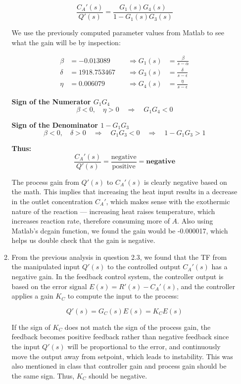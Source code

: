 \documentclass[12pt]{article}
\begin{document}
\begin{enumerate}
\begin{enumerate}
    \[
    \frac{C_A'(s)}{Q'(s)} = \frac{G_1(s) G_4(s)}{1 - G_1(s) G_3(s)}
    \]
    
    We use the previously computed parameter values from Matlab to see what the gain will be by inspection:
    
    \[
    \begin{aligned}
    \beta &= -0.013089 \quad &\Rightarrow G_1(s) &= \frac{\beta}{s - \alpha} \\
    \delta &= 1918.753467 \quad &\Rightarrow G_3(s) &= \frac{\delta}{s - \epsilon} \\
    \eta &= 0.006079 \quad &\Rightarrow G_4(s) &= \frac{\eta}{s - \epsilon}
    \end{aligned}
    \]
    
    \medskip
    
    \noindent\textbf{Sign of the Numerator \(G_1 G_4\)}  
    \[
    \beta < 0, \quad \eta > 0 \quad \Rightarrow \quad G_1 G_4 < 0
    \]
    
    \noindent\textbf{Sign of the Denominator \(1 - G_1 G_3\)}  
    \[
    \beta < 0, \quad \delta > 0 \quad \Rightarrow \quad G_1 G_3 < 0 \quad \Rightarrow \quad 1 - G_1 G_3 > 1
    \]
    
    \noindent\textbf{Thus:}
    \[
    \frac{C_A'(s)}{Q'(s)} = \frac{\text{negative}}{\text{positive}} = \textbf{negative}
    \]
    
    \medskip
    
    \noindent The process gain from \(Q'(s)\) to \(C_A'(s)\) is clearly negative based on the math. This implies that increasing the heat input results in a decrease in the outlet concentration \(C_A'\), which makes sense with the exothermic nature of the reaction — increasing heat raises temperature, which increases reaction rate, therefore consuming more of \(A\). Also using Matlab's dcgain function, we found the gain would be -0.000017, which helps us double check that the gain is negative.

    \item From the previous analysis in question 2.3, we found that the TF from the manipulated input \(Q'(s)\) to the controlled output \(C_A'(s)\) has a negative gain. In the feedback control system, the controller output is based on the error signal \(E(s) = R'(s) - C_A'(s)\), and the controller applies a gain \(K_C\) to compute the input to the process:
    
    \[
    Q'(s) = G_C(s) E(s) = K_C E(s)
    \]
    
    If the sign of \(K_C\) does not match the sign of the process gain, the feedback becomes positive feedback rather than negative feedback since the input \(Q'(s)\) will be proportional to the error, and continuously move the output away from setpoint, which leads to instability. This was also mentioned in class that controller gain and process gain should be the same sign. Thus, \(K_C\) should be negative.


\end{enumerate}
\end{enumerate}
\end{document}

